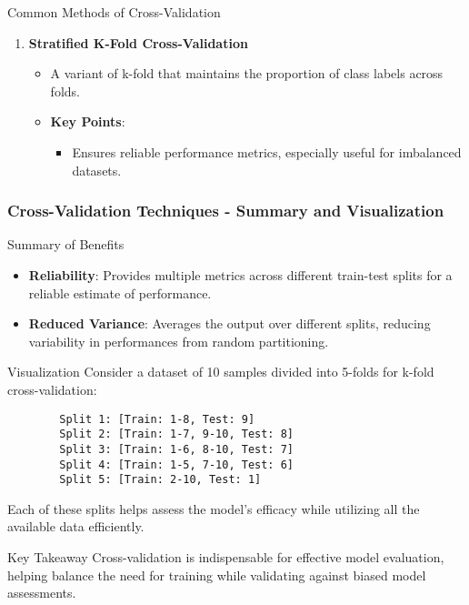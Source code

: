 \documentclass{beamer}
\begin{document}
\begin{frame}[fragile]
\begin{block}{Common Methods of Cross-Validation}
\begin{enumerate}
            \item \textbf{Stratified K-Fold Cross-Validation}
                \begin{itemize}
                    \item A variant of k-fold that maintains the proportion of class labels across folds.
                    \item \textbf{Key Points}:
                        \begin{itemize}
                            \item Ensures reliable performance metrics, especially useful for imbalanced datasets.
                        \end{itemize}
                \end{itemize}
        \end{enumerate}
    \end{block}
\end{frame}

\begin{frame}[fragile]
    \frametitle{Cross-Validation Techniques - Summary and Visualization}
    \begin{block}{Summary of Benefits}
        \begin{itemize}
            \item \textbf{Reliability}: Provides multiple metrics across different train-test splits for a reliable estimate of performance.
            \item \textbf{Reduced Variance}: Averages the output over different splits, reducing variability in performances from random partitioning.
        \end{itemize}
    \end{block}
    
    \begin{block}{Visualization}
        Consider a dataset of 10 samples divided into 5-folds for k-fold cross-validation:
        \begin{lstlisting}
        Split 1: [Train: 1-8, Test: 9]
        Split 2: [Train: 1-7, 9-10, Test: 8]
        Split 3: [Train: 1-6, 8-10, Test: 7]
        Split 4: [Train: 1-5, 7-10, Test: 6]
        Split 5: [Train: 2-10, Test: 1]
        \end{lstlisting}
        Each of these splits helps assess the model's efficacy while utilizing all the available data efficiently.
    \end{block}
    
    \begin{block}{Key Takeaway}
        Cross-validation is indispensable for effective model evaluation, helping balance the need for training while validating against biased model assessments.
    \end{block}
\end{frame}
\end{document}
